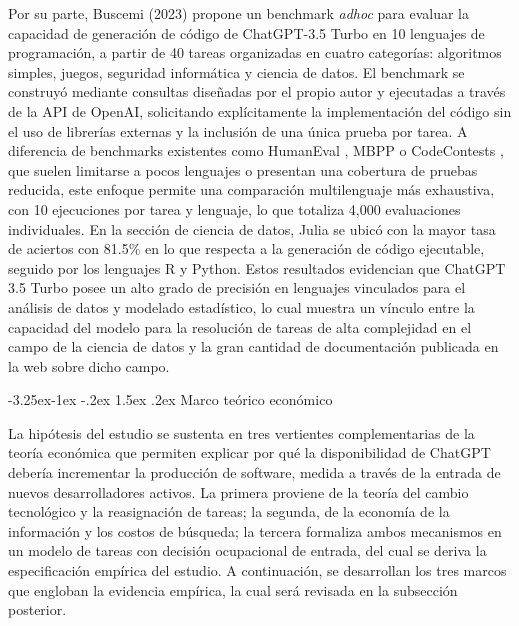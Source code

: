 \documentclass[12pt,a4paper]{article}
\makeatletter
\renewcommand\subsection{\@startsection{subsection}{2}{\z@}%
  {-3.25ex\@plus -1ex \@minus -.2ex}%
  {1.5ex \@plus .2ex}%
  {\normalfont\normalsize}}
\makeatother
\begin{document}
Por su parte, Buscemi (2023) propone un benchmark \textit{ad}\textit{hoc} para evaluar la capacidad de generación de código de ChatGPT-3.5 Turbo en 10 lenguajes de programación, a partir de 40 tareas organizadas en cuatro categorías: algoritmos simples, juegos, seguridad informática y ciencia de datos. El benchmark se construyó mediante consultas diseñadas por el propio autor y ejecutadas a través de la API de OpenAI, solicitando explícitamente la implementación del código sin el uso de librerías externas y la inclusión de una única prueba por tarea. A diferencia de benchmarks existentes como HumanEval , MBPP o CodeContests , que suelen limitarse a pocos lenguajes o presentan una cobertura de pruebas reducida, este enfoque permite una comparación multilenguaje más exhaustiva, con 10 ejecuciones por tarea y lenguaje, lo que totaliza 4,000 evaluaciones individuales. En la sección de ciencia de datos, Julia se ubicó con la mayor tasa de aciertos con 81.5\% en lo que respecta a la generación de código ejecutable, seguido por los lenguajes R y Python. Estos resultados evidencian que ChatGPT 3.5 Turbo posee un alto grado de precisión en lenguajes vinculados para el análisis de datos y modelado estadístico, lo cual muestra un vínculo entre la capacidad del modelo para la resolución de tareas de alta complejidad en el campo de la ciencia de datos y la gran cantidad de documentación publicada en la web sobre dicho campo.



\subsection{Marco teórico económico}\label{sec:marco_teorico}

La hipótesis del estudio se sustenta en tres vertientes complementarias de la teoría económica que permiten explicar por qué la disponibilidad de ChatGPT debería incrementar la producción de software, medida a través de la entrada de nuevos desarrolladores activos. La primera proviene de la teoría del cambio tecnológico y la reasignación de tareas; la segunda, de la economía de la información y los costos de búsqueda; la tercera formaliza ambos mecanismos en un modelo de tareas con decisión ocupacional de entrada, del cual se deriva la especificación empírica del estudio. A continuación, se desarrollan los tres marcos que engloban la evidencia empírica, la cual será revisada en la subsección posterior.
\end{document}
